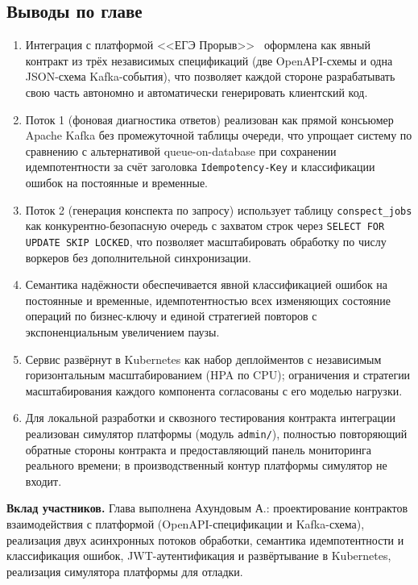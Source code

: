 \documentclass[a4paper,12pt]{extarticle}
\begin{document}
\subsection{Выводы по главе}

\begin{enumerate}
    \item Интеграция с платформой <<ЕГЭ Прорыв>>~\cite{exambreakout2026} оформлена как явный контракт из
        трёх независимых спецификаций (две OpenAPI-схемы и одна JSON-схема
        Kafka-события), что позволяет каждой стороне разрабатывать свою часть
        автономно и автоматически генерировать клиентский код.
    \item Поток 1 (фоновая диагностика ответов) реализован как прямой
        консьюмер Apache Kafka без промежуточной таблицы очереди, что упрощает
        систему по сравнению с альтернативой queue-on-database при сохранении
        идемпотентности за счёт заголовка \texttt{Idempotency-Key} и
        классификации ошибок на постоянные и временные.
    \item Поток 2 (генерация конспекта по запросу) использует таблицу
        \texttt{conspect\_jobs} как конкурентно-безопасную очередь с
        захватом строк через \texttt{SELECT FOR UPDATE SKIP LOCKED}, что
        позволяет масштабировать обработку по числу воркеров без
        дополнительной синхронизации.
    \item Семантика надёжности обеспечивается явной классификацией ошибок на
        постоянные и временные, идемпотентностью всех изменяющих состояние
        операций по бизнес-ключу и единой стратегией повторов с экспоненциальным
        увеличением паузы.
    \item Сервис развёрнут в Kubernetes как набор деплойментов с независимым
        горизонтальным масштабированием (HPA по CPU); ограничения и стратегии
        масштабирования каждого компонента согласованы с его моделью нагрузки.
    \item Для локальной разработки и сквозного тестирования контракта
        интеграции реализован симулятор платформы (модуль \texttt{admin/}),
        полностью повторяющий обратные стороны контракта и предоставляющий
        панель мониторинга реального времени; в производственный контур
        платформы симулятор не входит.
\end{enumerate}
\textbf{Вклад участников.}
Глава выполнена Ахундовым А.: проектирование контрактов взаимодействия с платформой
(OpenAPI-спецификации и Kafka-схема), реализация двух асинхронных потоков обработки,
семантика идемпотентности и классификация ошибок, JWT-аутентификация и развёртывание
в Kubernetes, реализация симулятора платформы для отладки.

\pagebreak


\newpage
\printbibliography[heading=bibintoc]
\end{document}
